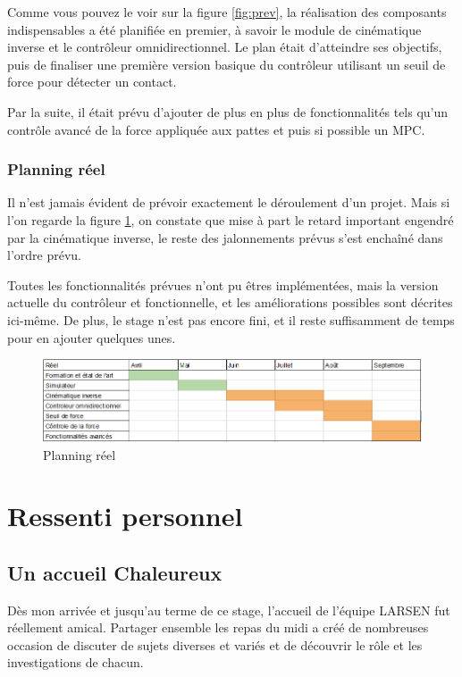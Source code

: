 \documentclass{tnreport}
\begin{document}
Comme vous pouvez le voir sur la figure \ref{fig:prev}, la réalisation des composants indispensables a été planifiée en premier, à savoir le module de cinématique inverse et le contrôleur omnidirectionnel. Le plan était d'atteindre ses objectifs, puis de finaliser une première version basique du contrôleur utilisant un seuil de force pour détecter un contact. 

Par la suite, il était prévu d'ajouter de plus en plus de fonctionnalités tels qu'un contrôle avancé de la force appliquée aux pattes et puis si possible un \gls{MPC}.
\newpage
\subsubsection{Planning réel}\label{lb:planningreel}

Il n'est jamais évident de prévoir exactement le déroulement d'un projet. Mais si l'on regarde la figure \ref{fig:reel}, on constate que mise à part le retard important engendré par la cinématique inverse, le reste des jalonnements prévus s'est enchaîné dans l'ordre prévu.

Toutes les fonctionnalités prévues n'ont pu êtres implémentées, mais la version actuelle du contrôleur et fonctionnelle, et les améliorations possibles sont décrites ici-même. De plus, le stage n'est pas encore fini, et il reste suffisamment de temps pour en ajouter quelques unes. 

\begin{figure}[h]
    \centering
    \includegraphics[width=\textwidth]{figures/reel}
    \caption{Planning réel }
    \label{fig:reel}
\end{figure}
\section{Ressenti personnel}
\subsection{Un accueil Chaleureux}
Dès mon arrivée et jusqu'au terme de ce stage, l'accueil de l'équipe \gls{LARSEN} fut réellement amical. Partager ensemble les repas du midi a créé de nombreuses occasion de discuter de sujets diverses et variés et de découvrir le rôle et les investigations de chacun.
\end{document}
